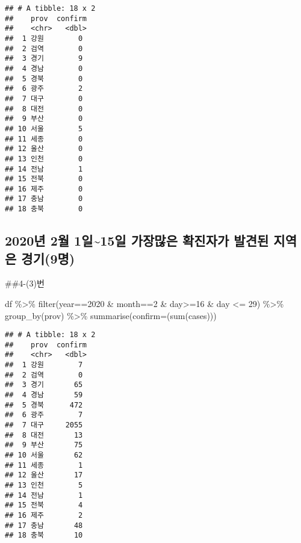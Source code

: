 \documentclass[
  12pt,
]{article}
\newenvironment{Shaded}{\begin{snugshade}}{\end{snugshade}}
\newcommand{\AttributeTok}[1]{\textcolor[rgb]{0.77,0.63,0.00}{#1}}
\newcommand{\DecValTok}[1]{\textcolor[rgb]{0.00,0.00,0.81}{#1}}
\newcommand{\FunctionTok}[1]{\textcolor[rgb]{0.00,0.00,0.00}{#1}}
\newcommand{\NormalTok}[1]{#1}
\newcommand{\SpecialCharTok}[1]{\textcolor[rgb]{0.00,0.00,0.00}{#1}}
\begin{document}
\begin{verbatim}
## # A tibble: 18 x 2
##    prov  confirm
##    <chr>   <dbl>
##  1 강원        0
##  2 검역        0
##  3 경기        9
##  4 경남        0
##  5 경북        0
##  6 광주        2
##  7 대구        0
##  8 대전        0
##  9 부산        0
## 10 서울        5
## 11 세종        0
## 12 울산        0
## 13 인천        0
## 14 전남        1
## 15 전북        0
## 16 제주        0
## 17 충남        0
## 18 충북        0
\end{verbatim}

\hypertarget{uxb144-2uxc6d4-1uxc77c15uxc77c-uxac00uxc7a5uxb9ceuxc740-uxd655uxc9c4uxc790uxac00-uxbc1cuxacacuxb41c-uxc9c0uxc5eduxc740-uxacbduxae309uxba85}{%
\subsection{2020년 2월 1일\textasciitilde15일 가장많은 확진자가 발견된
지역은
경기(9명)}\label{uxb144-2uxc6d4-1uxc77c15uxc77c-uxac00uxc7a5uxb9ceuxc740-uxd655uxc9c4uxc790uxac00-uxbc1cuxacacuxb41c-uxc9c0uxc5eduxc740-uxacbduxae309uxba85}}

\#\#4-(3)번

\begin{Shaded}
\begin{Highlighting}[]
\NormalTok{df }\SpecialCharTok{\%\textgreater{}\%} \FunctionTok{filter}\NormalTok{(year}\SpecialCharTok{==}\DecValTok{2020} \SpecialCharTok{\&}\NormalTok{ month}\SpecialCharTok{==}\DecValTok{2} \SpecialCharTok{\&}\NormalTok{ day}\SpecialCharTok{\textgreater{}=}\DecValTok{16} \SpecialCharTok{\&}\NormalTok{ day }\SpecialCharTok{\textless{}=} \DecValTok{29}\NormalTok{) }\SpecialCharTok{\%\textgreater{}\%} \FunctionTok{group\_by}\NormalTok{(prov) }\SpecialCharTok{\%\textgreater{}\%} \FunctionTok{summarise}\NormalTok{(}\AttributeTok{confirm=}\NormalTok{(}\FunctionTok{sum}\NormalTok{(cases)))}
\end{Highlighting}
\end{Shaded}

\begin{verbatim}
## # A tibble: 18 x 2
##    prov  confirm
##    <chr>   <dbl>
##  1 강원        7
##  2 검역        0
##  3 경기       65
##  4 경남       59
##  5 경북      472
##  6 광주        7
##  7 대구     2055
##  8 대전       13
##  9 부산       75
## 10 서울       62
## 11 세종        1
## 12 울산       17
## 13 인천        5
## 14 전남        1
## 15 전북        4
## 16 제주        2
## 17 충남       48
## 18 충북       10
\end{verbatim}
\end{document}

